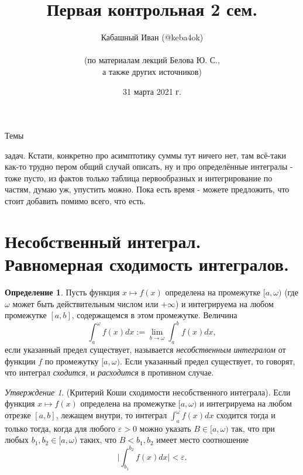 \documentclass[a4paper,100pt]{article}
\title{Первая контрольная 2 сем.}
\author{Кабашный Иван (@keba4ok)\\ \\ (по материалам лекций Белова Ю. С.,\\ а также других источников)}
\date{31 марта 2021 г.}
\theoremstyle{indented}
\theoremstyle{definition}
\newtheorem{defn}{Определение}
\theoremstyle{remark}
\newtheorem{stat}{Утверждение}
\begin{document}
\newcommand{\resetexlcounters}{%
  \setcounter{exl}{0}%
} 

\newcommand{\resetremarkcounters}{%
  \setcounter{remark}{0}%
} 

\newcommand{\reseconscounters}{%
  \setcounter{cons}{0}%
} 

\newcommand{\resetall}{%
    \resetexlcounters
    \resetremarkcounters
    \reseconscounters%
}

\maketitle 

\newpage

\hypertarget{t1}{Темы} задач. Кстати, конкретно про асимптотику суммы тут ничего нет, там всё-таки как-то трудно пером общий случай описать, ну и про определённые интегралы - тоже пусто, из фактов только таблица первообразных и интегрирование по частям, думаю уж, упустить можно. Пока есть время - можете предложить, что стоит добавить помимо всего, что есть.
\tableofcontents

\newpage

\section{Несобственный интеграл. \\
Равномерная сходимость интегралов.}

\begin{defn}
    Пусть функция $x \mapsto f(x)$ определена на промежутке $[a, \omega)$ (где $\omega$ может быть действительным числом или $+\infty$) и интегрируема на любом промежутке $[a, b]$, содержащемся в этом промежутке. Величина 
    \[
        \int_a^\omega f(x)dx:=\lim_{b \rightarrow \omega} \int_a^b f(x)dx, 
    \] 
    если указанный предел существует, называется \textit{несобственным интегралом} от функции $f$ по промежутку $[a, \omega)$. Если указанный предел существует, то говорят, что интеграл \textit{сходится}, и \textit{расходится} в противном случае.
\end{defn}

\begin{stat}
    (Критерий Коши сходимости несобственного интеграла). Если функция $x\mapsto f(x)$ определена на промежутке $[a, \omega)$ и интегрируема на любом отрезке $[a, b]$, лежащем внутри, то интеграл $\int_a^\omega f(x)dx$ сходится тогда и только тогда, когда для любого $\varepsilon>0$ можно указать $B\in [a, \omega)$ так, что при любых $b_1, b_2\in [a, \omega)$ таких, что $B<b_1, b_2$ имеет место соотношение 
    \[
        \bigg| \int_{b_1}^{b_2}f(x)dx\bigg| < \varepsilon. 
    \]
\end{stat}
\end{document}
